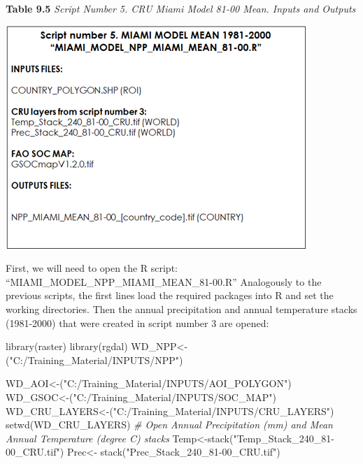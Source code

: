 \documentclass[
  10pt,
  b5paper,
]{book}
\newenvironment{Shaded}{\begin{snugshade}}{\end{snugshade}}
\newcommand{\CommentTok}[1]{\textcolor[rgb]{0.56,0.35,0.01}{\textit{#1}}}
\newcommand{\FunctionTok}[1]{\textcolor[rgb]{0.00,0.00,0.00}{#1}}
\newcommand{\NormalTok}[1]{#1}
\newcommand{\OtherTok}[1]{\textcolor[rgb]{0.56,0.35,0.01}{#1}}
\newcommand{\StringTok}[1]{\textcolor[rgb]{0.31,0.60,0.02}{#1}}
\begin{document}
\textbf{Table 9.5} \emph{Script Number 5. CRU Miami Model 81-00 Mean. Inputs and Outputs}

\includegraphics{tables/Table_9.4.png}

First, we will need to open the R script: ``MIAMI\_MODEL\_NPP\_MIAMI\_MEAN\_81-00.R''
Analogously to the previous scripts, the first lines load the required packages into R and set the working directories. Then the annual precipitation and annual temperature stacks (1981-2000) that were created in script number 3 are opened:

\begin{Shaded}
\begin{Highlighting}[]
\FunctionTok{library}\NormalTok{(raster)}
\FunctionTok{library}\NormalTok{(rgdal)}
\NormalTok{WD\_NPP}\OtherTok{\textless{}{-}}\NormalTok{(}\StringTok{"C:/Training\_Material/INPUTS/NPP"}\NormalTok{)}

\NormalTok{WD\_AOI}\OtherTok{\textless{}{-}}\NormalTok{(}\StringTok{"C:/Training\_Material/INPUTS/AOI\_POLYGON"}\NormalTok{)}
\NormalTok{WD\_GSOC}\OtherTok{\textless{}{-}}\NormalTok{(}\StringTok{"C:/Training\_Material/INPUTS/SOC\_MAP"}\NormalTok{)}
\NormalTok{WD\_CRU\_LAYERS}\OtherTok{\textless{}{-}}\NormalTok{(}\StringTok{"C:/Training\_Material/INPUTS/CRU\_LAYERS"}\NormalTok{)}
\FunctionTok{setwd}\NormalTok{(WD\_CRU\_LAYERS)}
\CommentTok{\# Open Annual Precipitation (mm) and Mean Annual Temperature (degree C) stacks}
\NormalTok{Temp}\OtherTok{\textless{}{-}}\FunctionTok{stack}\NormalTok{(}\StringTok{"Temp\_Stack\_240\_81{-}00\_CRU.tif"}\NormalTok{)}
\NormalTok{Prec}\OtherTok{\textless{}{-}} \FunctionTok{stack}\NormalTok{(}\StringTok{"Prec\_Stack\_240\_81{-}00\_CRU.tif"}\NormalTok{)}
\end{Highlighting}
\end{Shaded}
\end{document}

